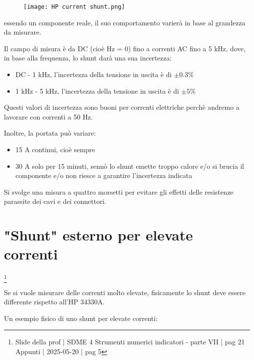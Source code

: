 \begin{figure}[h]
    \centering
    \texttt{[image: HP current shunt.png]}
\end{figure}


essendo un componente reale, il suo comportamento varierà in base al grandezza da misurare. \newline 

Il campo di misura è da DC (cioè Hz = 0) fino a correnti AC fino a 5 kHz, dove, in base alla frequenza, lo shunt darà una sua incertezza: 

\begin{itemize}
    \item DC - 1 kHz, l'incertezza della tensione in uscita è di $\pm 0.3 \%$
    \item 1 kHz - 5 kHz, l'incertezza della tensione in uscita è di $\pm 5 \%$
\end{itemize}

Questi valori di incertezza sono buoni per correnti elettriche perchè andremo a lavorare con correnti a 50 Hz. \newline 

Inoltre, la portata può variare: 

\begin{itemize}
    \item 15 A continui, cioè sempre 
    \item 30 A solo per 15 minuti, sennò lo shunt emette troppo calore e/o si brucia il componente e/o non riesce a garantire l'incertezza indicata
\end{itemize}

Si svolge una misura a quattro morsetti per evitare gli effetti delle resistenze parassite dei cavi e dei connettori. \newline 

\newpage 

\section{"Shunt" esterno per elevate correnti}
\footnote{Slide della prof | SDME 4 Strumenti numerici indicatori - parte VII | pag 21\\  
Appunti | 2025-05-20 | pag 5 }

Se si vuole misurare delle correnti molto elevate, fisicamente lo shunt deve essere differente rispetto all'HP 34330A. \newline 

Un esempio fisico di uno shunt per elevate correnti: 

